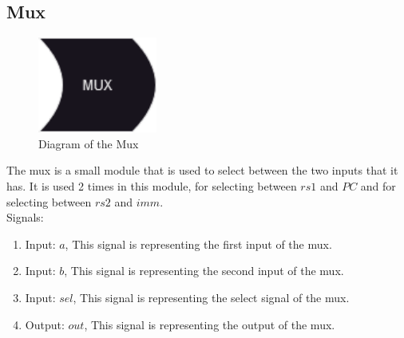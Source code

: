 \subsection{Mux}

\begin{figure}[H]
\centering
\includegraphics[width=0.35\textwidth]{../diagrams/decode/mux.png}
\caption{Diagram of the Mux}
\label{fig:mux}
\end{figure}

The mux is a small module that is used to select between the two inputs that it has. It is used 2 times in this module, for selecting between
$rs1$ and $PC$ and for selecting between $rs2$ and $imm$. \\

Signals:
\begin{enumerate}[label={\textbullet}]
    \item Input: $a$, This signal is representing the first input of the mux.
    \item Input: $b$, This signal is representing the second input of the mux.
    \item Input: $sel$, This signal is representing the select signal of the mux.
    \item Output: $out$, This signal is representing the output of the mux.
\end{enumerate}
